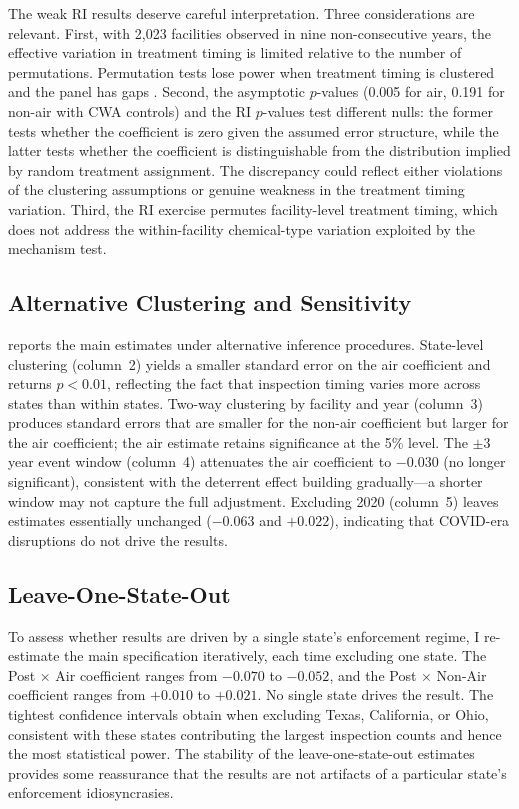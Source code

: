 \documentclass[12pt]{article}
\begin{document}
The weak RI results deserve careful interpretation. Three considerations are relevant. First, with 2,023 facilities observed in nine non-consecutive years, the effective variation in treatment timing is limited relative to the number of permutations. Permutation tests lose power when treatment timing is clustered and the panel has gaps \citep{callawaysantanna2021}. Second, the asymptotic $p$-values (0.005 for air, 0.191 for non-air with CWA controls) and the RI $p$-values test different nulls: the former tests whether the coefficient is zero given the assumed error structure, while the latter tests whether the coefficient is distinguishable from the distribution implied by random treatment assignment. The discrepancy could reflect either violations of the clustering assumptions or genuine weakness in the treatment timing variation. Third, the RI exercise permutes facility-level treatment timing, which does not address the within-facility chemical-type variation exploited by the mechanism test.

\subsection{Alternative Clustering and Sensitivity}

 reports the main estimates under alternative inference procedures. State-level clustering (column~2) yields a smaller standard error on the air coefficient and returns $p < 0.01$, reflecting the fact that inspection timing varies more across states than within states. Two-way clustering by facility and year (column~3) produces standard errors that are smaller for the non-air coefficient but larger for the air coefficient; the air estimate retains significance at the 5\% level. The $\pm 3$ year event window (column~4) attenuates the air coefficient to $-0.030$ (no longer significant), consistent with the deterrent effect building gradually---a shorter window may not capture the full adjustment. Excluding 2020 (column~5) leaves estimates essentially unchanged ($-0.063$ and $+0.022$), indicating that COVID-era disruptions do not drive the results.

\subsection{Leave-One-State-Out}
\label{subsec:loso}

To assess whether results are driven by a single state's enforcement regime, I re-estimate the main specification iteratively, each time excluding one state. The Post $\times$ Air coefficient ranges from $-0.070$ to $-0.052$, and the Post $\times$ Non-Air coefficient ranges from $+0.010$ to $+0.021$. No single state drives the result. The tightest confidence intervals obtain when excluding Texas, California, or Ohio, consistent with these states contributing the largest inspection counts and hence the most statistical power. The stability of the leave-one-state-out estimates provides some reassurance that the results are not artifacts of a particular state's enforcement idiosyncrasies.
\end{document}
